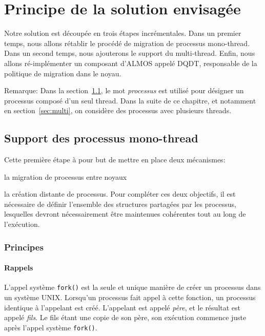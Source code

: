 \chapter{Principe de la solution envisagée}
\label{chap:sol}

  Notre solution est découpée en trois étapes incrémentales. Dans un premier
  temps, nous allons rétablir le procédé de migration de processus
  mono-thread. Dans un second temps, nous ajouterons le support du
  multi-thread. Enfin, nous allons ré-implémenter un composant d'ALMOS appelé
  DQDT, responsable de la politique de migration dans le noyau.

  \begin{paragraph}{Remarque:}
    Dans la section~\ref{sec:mono}, le mot \textit{processus} est utilisé pour
    désigner un processus composé d'un seul thread. Dans la suite de ce
    chapitre, et notamment en section~\ref{sec:multi}, on considère des
    processus avec plusieurs threads.
  \end{paragraph}


  \section{Support des processus mono-thread}
  \label{sec:mono}

    Cette première étape à pour but de mettre en place deux mécanismes:
    \benumline \item la migration de processus entre noyaux \item la création
    distante de processus\eenumline. Pour compléter ces deux objectifs, il est
    nécessaire de définir l'ensemble des structures partagées par les processus,
    lesquelles devront nécessairement être maintenues cohérentes tout au long de
    l'exécution.

    \subsection{Principes}

      \subsubsection{Rappels}

        L'appel système \texttt{fork()} est la seule et unique manière de créer
        un processus dans un système UNIX. Lorsqu'un processus fait appel à
        cette fonction, un processus identique à l'appelant est créé. L'appelant
        est appelé \textit{père}, et le résultat est appelé \textit{fils}. Le
        fils étant une copie de son père, son exécution commence juste après
        l'appel système \texttt{fork()}.

